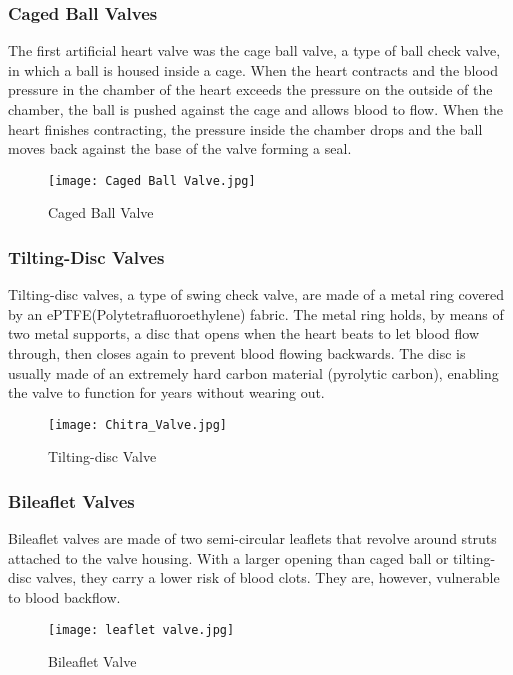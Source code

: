 \documentclass[12pt]{article}
\begin{document}
\begin{normalsize}
\subsubsection{Caged Ball Valves}
The first artificial heart valve was the cage ball valve, a type of ball check valve, in which a ball is housed inside a cage. When the heart contracts and the blood pressure in the chamber of the heart exceeds the pressure on the outside of the chamber, the ball is pushed against the cage and allows blood to flow. When the heart finishes contracting, the pressure inside the chamber drops and the ball moves back against the base of the valve forming a seal.
\begin{figure}[h]
\centering
\texttt{[image: Caged Ball Valve.jpg]}
\caption{Caged Ball Valve}
\end{figure}

\subsubsection{Tilting-Disc Valves}
Tilting-disc valves, a type of swing check valve, are made of a metal ring covered by an ePTFE(Polytetrafluoroethylene) fabric. The metal ring holds, by means of two metal supports, a disc that opens when the heart beats to let blood flow through, then closes again to prevent blood flowing backwards. The disc is usually made of an extremely hard carbon material (pyrolytic carbon), enabling the valve to function for years without wearing out.
\begin{figure}[h]
\centering
\texttt{[image: Chitra\_Valve.jpg]}
\caption{Tilting-disc Valve}
\end{figure}
\subsubsection{Bileaflet Valves}
Bileaflet valves are made of two semi-circular leaflets that revolve around struts attached to the valve housing. With a larger opening than caged ball or tilting-disc valves, they carry a lower risk of blood clots. They are, however, vulnerable to blood backflow.
\begin{figure}[h]
\centering
\texttt{[image: leaflet valve.jpg]}
\caption{Bileaflet Valve}
\end{figure}

\end{normalsize}
\end{document}

